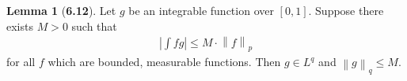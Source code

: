 \documentclass[12pt]{article}
\newcommand{\norm}[1]{\left\lVert #1 \right\rVert}
\theoremstyle{definition}
\newtheorem*{lemma}{Lemma}
\begin{document}
\begin{lemma}[\textbf{6.12}]

    Let \( g \) be an integrable function over \( [0,1] \). Suppose there exists \( M >0 \) such that 
        \begin{align*}
            \left| \int fg \right| \leq M \cdot \norm{f}_{p}
        \end{align*}
    for all \( f \) which are bounded, measurable functions. 
    Then \( g \in L^q \) and \( \norm{g}_{q} \leq M \).
    
\end{lemma}
\end{document}
